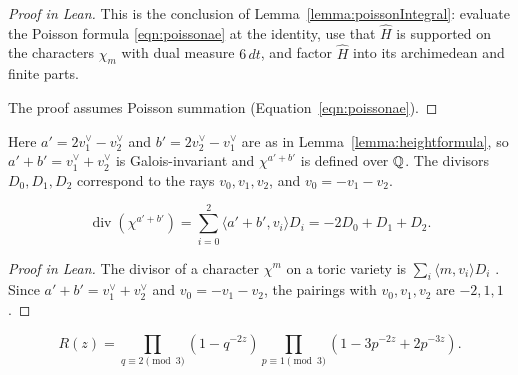 \begin{proof}[Proof in Lean]

\leanok


This is the conclusion of Lemma~\ref{lemma:poissonIntegral}: evaluate the Poisson formula \eqref{eqn:poissonae} at the identity, use that $\widehat{H}$ is supported on the characters $\chi_m$ with dual measure $6\,dt$, and factor $\widehat H$ into its archimedean and finite parts.

The proof assumes Poisson summation (Equation~\ref{eqn:poissonae}).

\end{proof}

\begin{equationnode}

\label{eqn:normCharacterDivisor}


\leanok

Here $a'=2v_1^\vee-v_2^\vee$ and $b'=2v_2^\vee-v_1^\vee$ are as in Lemma~\ref{lemma:heightformula}, so $a'+b'=v_1^\vee+v_2^\vee$ is Galois-invariant and $\chi^{a'+b'}$ is defined over $\mathbb{Q}$. The divisors $D_0,D_1,D_2$ correspond to the rays $v_0,v_1,v_2$, and $v_0=-v_1-v_2$.

\begin{equation*} \operatorname{div}(\chi^{a'+b'}) =\sum_{i=0}^2\langle a'+b',v_i\rangle D_i =-2D_0+D_1+D_2. \end{equation*}

\end{equationnode}

\begin{proof}[Proof in Lean]

\leanok

The divisor of a character $\chi^m$ on a toric variety is $\sum_i\langle m,v_i\rangle D_i$ \cite[\S3.3]{MR1234037}. Since $a'+b'=v_1^\vee+v_2^\vee$ and $v_0=-v_1-v_2$, the pairings with $v_0,v_1,v_2$ are $-2,1,1$.

\end{proof}

\begin{equationnode}

\label{eqn:eulerCorrectionFactor}


\leanok



\begin{equation*} R(z)=\prod_{q\equiv2\pmod3}\left(1-q^{-2z}\right) \prod_{p\equiv1\pmod3}\left(1-3p^{-2z}+2p^{-3z}\right). \end{equation*}

\end{equationnode}

